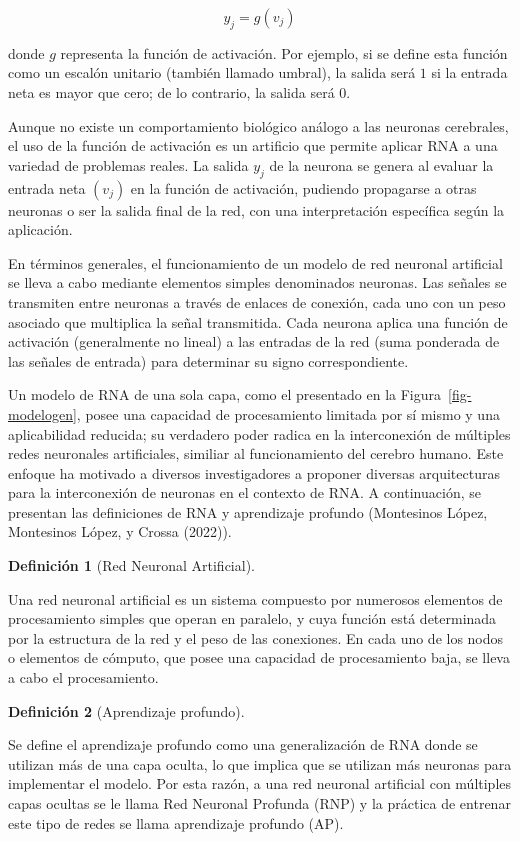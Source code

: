 \documentclass[
  us-letterpaper,
]{scrreprt}
\theoremstyle{definition}
\theoremstyle{plain}
\theoremstyle{plain}
\theoremstyle{definition}
\newtheorem{definition}{Definición}[chapter]
\theoremstyle{remark}
\begin{document}
\[
y_j=g(v_j)
\]

donde \(g\) representa la función de activación. Por ejemplo, si se
define esta función como un escalón unitario (también llamado umbral),
la salida será \(1\) si la entrada neta es mayor que cero; de lo
contrario, la salida será \(0\).

Aunque no existe un comportamiento biológico análogo a las neuronas
cerebrales, el uso de la función de activación es un artificio que
permite aplicar RNA a una variedad de problemas reales. La salida
\(y_j\) de la neurona se genera al evaluar la entrada neta \((v_j)\) en
la función de activación, pudiendo propagarse a otras neuronas o ser la
salida final de la red, con una interpretación específica según la
aplicación.

En términos generales, el funcionamiento de un modelo de red neuronal
artificial se lleva a cabo mediante elementos simples denominados
neuronas. Las señales se transmiten entre neuronas a través de enlaces
de conexión, cada uno con un peso asociado que multiplica la señal
transmitida. Cada neurona aplica una función de activación (generalmente
no lineal) a las entradas de la red (suma ponderada de las señales de
entrada) para determinar su signo correspondiente.

Un modelo de RNA de una sola capa, como el presentado en la
Figura~\ref{fig-modelogen}, posee una capacidad de procesamiento
limitada por sí mismo y una aplicabilidad reducida; su verdadero poder
radica en la interconexión de múltiples redes neuronales artificiales,
similiar al funcionamiento del cerebro humano. Este enfoque ha motivado
a diversos investigadores a proponer diversas arquitecturas para la
interconexión de neuronas en el contexto de RNA. A continuación, se
presentan las definiciones de RNA y aprendizaje profundo (Montesinos
López, Montesinos López, y Crossa (2022)).

\begin{definition}[Red Neuronal
Artificial]\protect\hypertarget{def-ANN}{}\label{def-ANN}

Una red neuronal artificial es un sistema compuesto por numerosos
elementos de procesamiento simples que operan en paralelo, y cuya
función está determinada por la estructura de la red y el peso de las
conexiones. En cada uno de los nodos o elementos de cómputo, que posee
una capacidad de procesamiento baja, se lleva a cabo el procesamiento.

\end{definition}

\begin{definition}[Aprendizaje
profundo]\protect\hypertarget{def-AP}{}\label{def-AP}

Se define el aprendizaje profundo como una generalización de RNA donde
se utilizan más de una capa oculta, lo que implica que se utilizan más
neuronas para implementar el modelo. Por esta razón, a una red neuronal
artificial con múltiples capas ocultas se le llama Red Neuronal Profunda
(RNP) y la práctica de entrenar este tipo de redes se llama aprendizaje
profundo (AP).

\end{definition}
\end{document}

